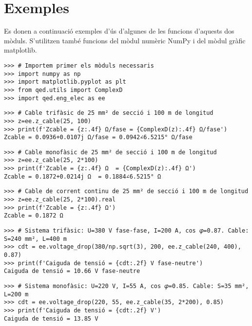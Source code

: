 


\section{Exemples}
Es donen a continuació  exemples d'ús d'algunes de les funcions d'aquests dos mòduls. S'utilitzen també funcions del mòdul numèric NumPy i del mòdul gràfic matplotlib.

\begin{lstlisting}
>>> # Importem primer els mòduls necessaris
>>> import numpy as np
>>> import matplotlib.pyplot as plt
>>> from qed.utils import ComplexD
>>> import qed.eng_elec as ee
\end{lstlisting} 


\begin{lstlisting}
>>> # Cable trifàsic de 25 mm² de secció i 100 m de longitud
>>> z=ee.z_cable(25, 100)
>>> print(f'Zcable = {z:.4f} Ω/fase = {ComplexD(z):.4f} Ω/fase')
Zcable = 0.0936+0.0107j Ω/fase = 0.0942∠6.5215° Ω/fase	
\end{lstlisting} 

\begin{lstlisting}
>>> # Cable monofàsic de 25 mm² de secció i 100 m de longitud
>>> z=ee.z_cable(25, 2*100)
>>> print(f'Zcable = {z:.4f} Ω  = {ComplexD(z):.4f} Ω')
Zcable = 0.1872+0.0214j Ω  = 0.1884∠6.5215° Ω	
\end{lstlisting}

\begin{lstlisting}
>>> # Cable de corrent continu de 25 mm² de secció i 100 m de longitud
>>> z=ee.z_cable(25, 2*100).real
>>> print(f'Zcable = {z:.4f} Ω')
Zcable = 0.1872 Ω	
\end{lstlisting}

\begin{lstlisting}
>>> # Sistema trifàsic: U=380 V fase-fase, I=200 A, cos 𝜑=0.87. Cable: S=240 mm², L=400 m
>>> cdt = ee.voltage_drop(380/np.sqrt(3), 200, ee.z_cable(240, 400), 0.87)
>>> print(f'Caiguda de tensió = {cdt:.2f} V fase-neutre')
Caiguda de tensió = 10.66 V fase-neutre
\end{lstlisting}

\begin{lstlisting}
>>> # Sistema monofàsic: U=220 V, I=55 A, cos 𝜑=0.85. Cable: S=35 mm², L=200 m
>>> cdt = ee.voltage_drop(220, 55, ee.z_cable(35, 2*200), 0.85)
>>> print(f'Caiguda de tensió = {cdt:.2f} V')
Caiguda de tensió = 13.85 V
\end{lstlisting}

